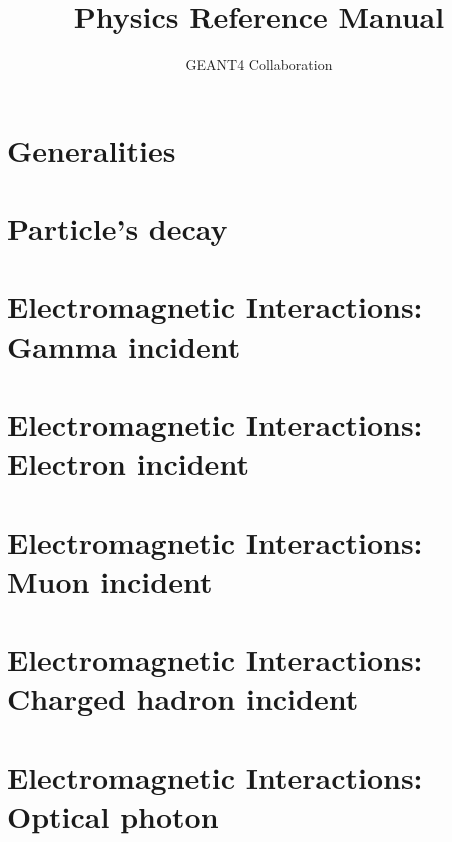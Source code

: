\documentclass[11pt,twoside]{report}
\title{Physics Reference Manual}
\author{GEANT4 Collaboration}
\begin{document}
\maketitle

\part{Generalities}




\part{Particle's decay}


\part{Electromagnetic Interactions: Gamma incident}



\part{Electromagnetic Interactions: Electron incident}
%








\part{Electromagnetic Interactions: Muon incident}





\part{Electromagnetic Interactions: Charged hadron incident}
%



\part{Electromagnetic Interactions: Optical photon}

\end{document}
